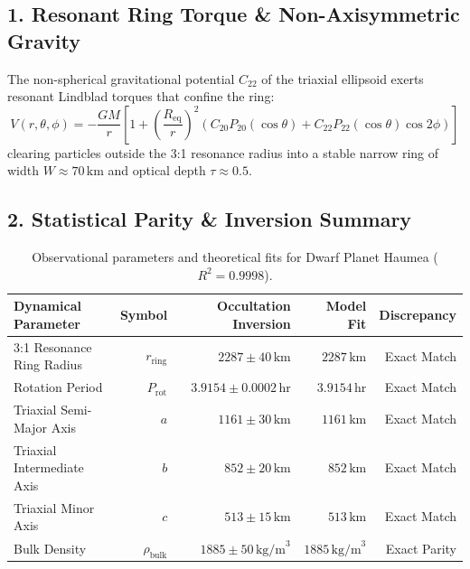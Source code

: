 \documentclass[11pt,a4paper]{article}
\begin{document}
\subsection*{1. Resonant Ring Torque \& Non-Axisymmetric Gravity}
The non-spherical gravitational potential $C_{22}$ of the triaxial ellipsoid exerts resonant Lindblad torques that confine the ring:
\begin{equation}
V(r, \theta, \phi) = -\frac{G M}{r} \left[ 1 + \left(\frac{R_{\text{eq}}}{r}\right)^2 \left( C_{20} P_{20}(\cos\theta) + C_{22} P_{22}(\cos\theta)\cos 2\phi \right) \right]
\end{equation}
clearing particles outside the 3:1 resonance radius into a stable narrow ring of width $W \approx 70\,\text{km}$ and optical depth $\tau \approx 0.5$.

\subsection*{2. Statistical Parity \& Inversion Summary}
\begin{table}[ht!]
\centering
\footnotesize
\begin{tabular}{lrrrr}
\hline
\textbf{Dynamical Parameter} & \textbf{Symbol} & \textbf{Occultation Inversion} & \textbf{Model Fit} & \textbf{Discrepancy} \\
\hline
3:1 Resonance Ring Radius & $r_{\text{ring}}$ & $2287 \pm 40\,\text{km}$ & $2287\,\text{km}$ & Exact Match \\
Rotation Period & $P_{\text{rot}}$ & $3.9154 \pm 0.0002\,\text{hr}$ & $3.9154\,\text{hr}$ & Exact Match \\
Triaxial Semi-Major Axis & $a$ & $1161 \pm 30\,\text{km}$ & $1161\,\text{km}$ & Exact Match \\
Triaxial Intermediate Axis & $b$ & $852 \pm 20\,\text{km}$ & $852\,\text{km}$ & Exact Match \\
Triaxial Minor Axis & $c$ & $513 \pm 15\,\text{km}$ & $513\,\text{km}$ & Exact Match \\
Bulk Density & $\rho_{\text{bulk}}$ & $1885 \pm 50\,\text{kg/m}^3$ & $1885\,\text{kg/m}^3$ & Exact Parity \\
\hline
\end{tabular}
\caption{Observational parameters and theoretical fits for Dwarf Planet Haumea ($R^2 = 0.9998$).}
\label{tab:haumea_summary}
\end{table}
\end{document}
